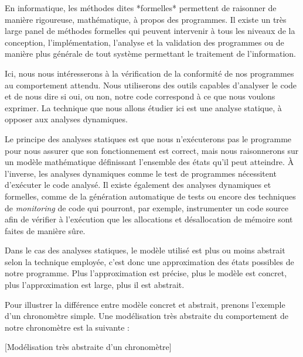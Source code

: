 
En informatique, les méthodes dites *formelles* permettent
 de raisonner de manière rigoureuse, mathématique, à propos des
programmes. Il existe un très large panel de méthodes formelles qui peuvent
intervenir à tous les niveaux de la conception, l'implémentation, l'analyse et
la validation des programmes ou de manière plus générale de tout système
permettant le traitement de l'information.



Ici, nous nous intéresserons à la vérification de la conformité de nos
programmes au comportement attendu. Nous utiliserons
des outils capables d'analyser le code et de nous dire si oui, ou non, notre
code correspond à ce que nous voulons exprimer. La technique que nous allons
étudier ici est une analyse statique, à opposer aux analyses dynamiques.



Le principe des analyses statiques est que nous n'exécuterons pas le programme
pour nous assurer que son fonctionnement est correct, mais nous raisonnerons sur
un modèle mathématique définissant l'ensemble des états qu'il peut atteindre.
À l'inverse, les analyses dynamiques comme le test de programmes nécessitent
d'exécuter le code analysé. Il existe également des analyses dynamiques et
formelles, comme de la génération automatique de tests ou encore des techniques
de \textit{monitoring} de code qui pourront, par exemple, instrumenter un code
source afin de vérifier à l'exécution que les allocations et désallocation de
mémoire sont faites de manière sûre.



Dans le cas des analyses statiques, le modèle utilisé est plus ou moins
abstrait selon la technique employée, c'est donc une approximation des états
possibles de notre programme. Plus l'approximation est précise, plus le modèle est
concret, plus l'approximation est large, plus il est abstrait.



Pour illustrer la différence entre modèle concret et abstrait, prenons
l'exemple d'un chronomètre simple. Une modélisation très abstraite du
comportement de notre chronomètre est la suivante :


[Modélisation très abstraite d'un chronomètre]


